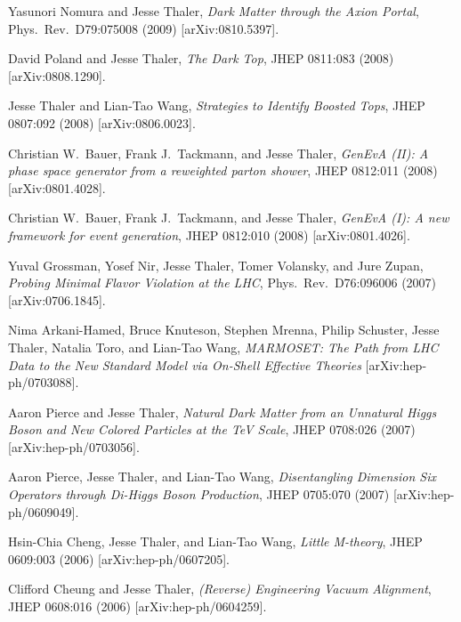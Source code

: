 \begin{list}{[]\addtocounter{jessecount}{-1}}{\leftmargin=3em \itemsep=4pt}
\item
 Yasunori Nomura and Jesse Thaler,
\emph{Dark Matter through the Axion Portal},
Phys.\ Rev.\ D79:075008 (2009)
[arXiv:0810.5397].

\item
 David Poland and Jesse Thaler,
\emph{The Dark Top},
JHEP 0811:083 (2008)
[arXiv:0808.1290].

\item
 Jesse Thaler and Lian-Tao Wang,
\emph{Strategies to Identify Boosted Tops},
JHEP 0807:092 (2008)
[arXiv:0806.0023].

\item
 Christian W.\ Bauer, Frank J.\ Tackmann, and Jesse Thaler,
\emph{GenEvA (II): A phase space generator from a reweighted parton shower},
JHEP 0812:011 (2008)
[arXiv:0801.4028].

\item
 Christian W.\ Bauer, Frank J.\ Tackmann, and Jesse Thaler,
\emph{GenEvA (I): A new framework for event generation},
JHEP 0812:010 (2008)
[arXiv:0801.4026].

\item
 Yuval Grossman, Yosef Nir, Jesse Thaler, Tomer Volansky, and Jure Zupan,
\emph{Probing Minimal Flavor Violation at the LHC},
Phys.\ Rev.\ D76:096006 (2007)
[arXiv:0706.1845].

\item
 Nima Arkani-Hamed, Bruce Knuteson, Stephen Mrenna, Philip Schuster, Jesse Thaler, Natalia Toro, and Lian-Tao Wang,
\emph{MARMOSET: The Path from LHC Data to the New Standard Model via On-Shell Effective Theories}
[arXiv:hep-ph/0703088].

\item
 Aaron Pierce and Jesse Thaler,
\emph{Natural Dark Matter from an Unnatural Higgs Boson and New Colored Particles at the TeV Scale},
JHEP 0708:026 (2007)
[arXiv:hep-ph/0703056].

\item
 Aaron Pierce, Jesse Thaler, and Lian-Tao Wang,
\emph{Disentangling Dimension Six Operators through Di-Higgs Boson Production},
JHEP 0705:070 (2007)
[arXiv:hep-ph/0609049].

\item
 Hsin-Chia Cheng, Jesse Thaler, and Lian-Tao Wang,
\emph{Little M-theory},
JHEP 0609:003 (2006)
[arXiv:hep-ph/0607205].

\item
 Clifford Cheung and Jesse Thaler,
\emph{(Reverse) Engineering Vacuum Alignment},
JHEP 0608:016 (2006)
[arXiv:hep-ph/0604259].


\end{list}
